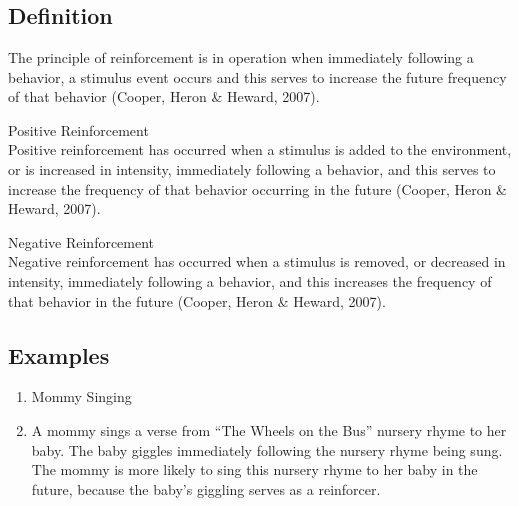 \clearpage \section{\fourdOne{}}
\subsection{Definition}
The principle of reinforcement is in operation when immediately following a behavior, a stimulus event occurs and this serves to increase the future frequency of that behavior (Cooper, Heron \& Heward, 2007).

Positive Reinforcement\\
Positive reinforcement has occurred when a stimulus is added to the environment, or is increased in intensity, immediately following a behavior, and this serves to increase the frequency of that behavior occurring in the future (Cooper, Heron \& Heward, 2007).

Negative Reinforcement\\
Negative reinforcement has occurred when a stimulus is removed, or decreased in intensity, immediately following a behavior, and this increases the frequency of that behavior in the future (Cooper, Heron \& Heward, 2007).
\subsection{Examples}
\begin{enumerate}
\item Mommy Singing
\item A mommy sings a verse from ``The Wheels on the Bus'' nursery rhyme to her baby. The baby giggles immediately following the nursery rhyme being sung. The mommy is more likely to sing this nursery rhyme to her baby in the future, because the baby's giggling serves as a reinforcer.
\end{enumerate}
 
